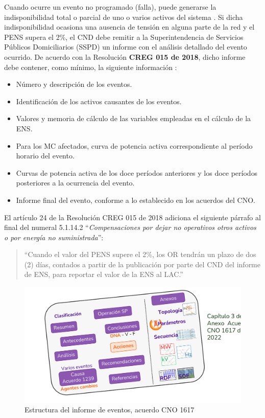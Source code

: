 \documentclass[a5paper]{book}%
\begin{document}
Cuando ocurre un evento no programado (falla), puede generarse la indisponibilidad total o parcial de uno o varios activos del sistema \cite{CREG0942012}.  
Si dicha indisponibilidad ocasiona una ausencia de tensión en alguna parte de la red y el \ac{PENS} supera el 2\%, el \ac{CND} debe remitir a la Superintendencia de Servicios Públicos Domiciliarios (SSPD) un informe con el análisis detallado del evento ocurrido. De acuerdo con la Resolución \textbf{CREG 015 de 2018}, dicho informe debe contener, como mínimo, la siguiente información \cite{CREG0152018}:

\begin{itemize}
    \item Número y descripción de los eventos.
    \item Identificación de los activos causantes de los eventos.
    \item Valores y memoria de cálculo de las variables empleadas en el cálculo de la \ac{ENS}.
    \item Para los \ac{MC} afectados, curva de potencia activa correspondiente al período horario del evento.
    \item Curvas de potencia activa de los doce períodos anteriores y los doce períodos posteriores a la ocurrencia del evento.
    \item Informe final del evento, conforme a lo establecido en los acuerdos del \ac{CNO}.
\end{itemize}

El artículo 24 de la Resolución CREG 015 de 2018 adiciona el siguiente párrafo al final del numeral 5.1.14.2 “\textit{Compensaciones por dejar no operativos otros activos o por energía no suministrada}”:  

\begin{quote}
    “Cuando el valor del \ac{PENS} supere el 2\%, los \ac{OR} tendrán un plazo de dos (2) días, contados a partir de la publicación por parte del \ac{CND} del informe de \ac{ENS}, para reportar el valor de la \ac{ENS} al \ac{LAC}.”
\end{quote}

\begin{figure}[H]
    \centering
    \includegraphics[width=\linewidth]{estructura_informe_eventos1617}
    \caption{Estructura del informe de eventos, acuerdo CNO 1617}
    \label{fig:estructurainforme}
\end{figure}
\end{document}
